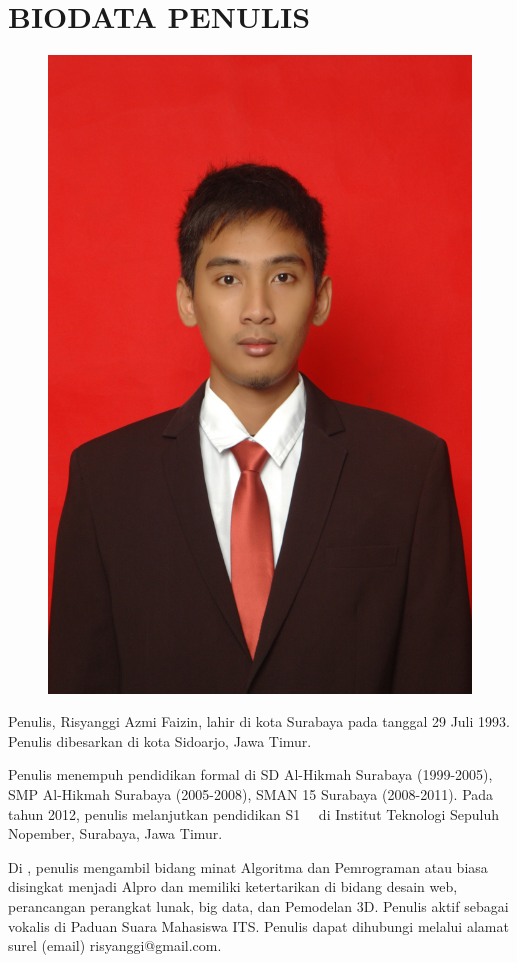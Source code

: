 \chapter{BIODATA PENULIS}

\begin{figure}
  \includegraphics[height=0.3\textheight]{../img/foto.jpg}
\end{figure}

Penulis, Risyanggi Azmi Faizin, lahir di kota Surabaya pada tanggal 29 Juli 1993. Penulis dibesarkan di kota Sidoarjo, Jawa Timur. 

Penulis menempuh pendidikan formal di SD Al-Hikmah Surabaya (1999-2005), SMP Al-Hikmah Surabaya (2005-2008), SMAN 15 Surabaya (2008-2011). Pada tahun 2012, penulis melanjutkan pendidikan S1 \jurusanbaru\ \fakultasbaru\ di Institut Teknologi Sepuluh Nopember, Surabaya, Jawa Timur.

Di \jurusanbaru, penulis mengambil bidang minat Algoritma dan Pemrograman atau biasa disingkat menjadi Alpro dan memiliki ketertarikan di bidang desain web, perancangan perangkat lunak, big data, dan Pemodelan 3D. Penulis aktif sebagai vokalis di Paduan Suara Mahasiswa ITS. Penulis dapat dihubungi melalui alamat surel (email) risyanggi@gmail.com.
